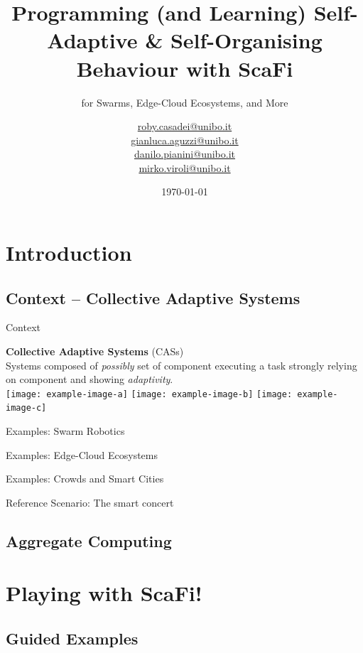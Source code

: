 \documentclass[presentation, 8pt]{beamer}\mode<presentation>{\usetheme{AMSBolognaFC}}
\title[Programming with ScaFi!]
{Programming (and Learning) Self-Adaptive \& Self-Organising Behaviour with ScaFi}
\subtitle{for Swarms, Edge-Cloud Ecosystems, and More}
\author[\sspeaker{Casedei}]
{\speaker{Roberto Casadei} \href{mailto:roby.casadei@unibo.it}{roby.casadei@unibo.it} \\
\speaker{Gianluca Aguzzi} \href{mailto:gianluca.aguzzi@unibo.it}{gianluca.aguzzi@unibo.it} \\
\speaker{Danilo Pianini} \href{mailto:danilo.pianini@unibo.it}{danilo.pianini@unibo.it} \\
\speaker{Mirko Viroli} \href{mailto:mirko.viroli@unibo.it}{mirko.viroli@unibo.it}}
\institute[DISI, Univ.\ Bologna]
{%
\textsc{Alma Mater Studiorum} -- Universit{\`a} di Bologna \\[0.1cm]
\textbf{Talk @} \bold{International Conference on Autonomic Computing and Self-Organizing Systems (ACSOS)}}
\date[\today]{\today}
\begin{document}
\frame{\titlepage}
\section{Introduction}
\subsection{Context -- Collective Adaptive Systems}
\begin{frame}{Context}

\end{frame}
\begin{frame}[plain,c]
	\begin{center}
	\Huge \textbf{Collective Adaptive Systems} (CASs)\\
	{\large Systems composed of \emph{possibly}  set of component executing a  task strongly relying on component  and showing  \emph{adaptivity}.}\\[0.3cm]
	\texttt{[image: example-image-a]}
	\texttt{[image: example-image-b]}
	\texttt{[image: example-image-c]}	
	\end{center}
\end{frame}

\begin{frame}{Examples: Swarm Robotics}

\end{frame}
\begin{frame}{Examples: Edge-Cloud Ecosystems}

\end{frame}
\begin{frame}{Examples: Crowds and Smart Cities}
\end{frame}

\begin{frame}{Reference Scenario: The smart concert}

\end{frame}

\subsection{Aggregate Computing}
\section{Playing with ScaFi!}
\subsection{Guided Examples}
\end{document}

